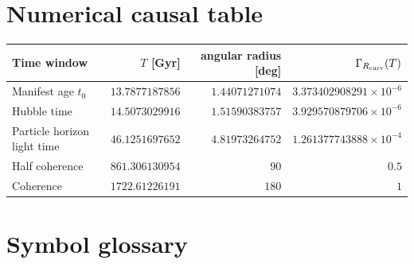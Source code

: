 \documentclass[11pt,a4paper]{article}
\begin{document}
\section{Numerical causal table}
\label{sec:numerical-causal-table}

\begin{center}
\small
\begin{tabular}{lrrr}
\toprule
Time window & $T$ [Gyr] & angular radius [deg] & $\Gamma_{R_{\rm curv}}(T)$\\
\midrule
Manifest age $t_0$ & $13.7877187856$ & $1.44071271074$ & $3.373402908291\times10^{-6}$\\
Hubble time & $14.5073029916$ & $1.51590383757$ & $3.929570879706\times10^{-6}$\\
Particle horizon light time & $46.1251697652$ & $4.81973264752$ & $1.261377743888\times10^{-4}$\\
Half coherence & $861.306130954$ & $90$ & $0.5$\\
Coherence & $1722.61226191$ & $180$ & $1$\\
\bottomrule
\end{tabular}
\end{center}


\section{Symbol glossary}
\end{document}
